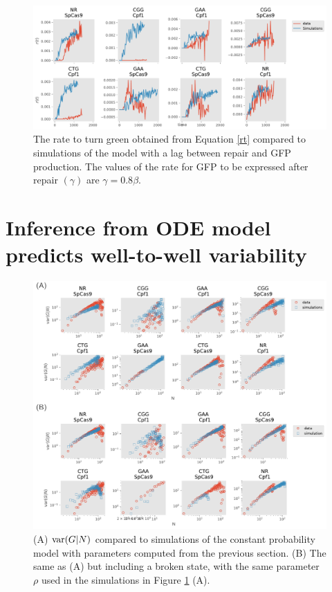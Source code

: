 \documentclass{article}
\begin{document}
\begin{figure}[h!]
\centering
\includegraphics[scale=0.6]{./../figures/r-vs-t_data_vs_gfp_lag_time.pdf}
\caption{ The rate to turn green obtained from Equation \ref{rt} compared to simulations of the model with a lag between repair and GFP production. The values of the rate for GFP to be expressed after repair $(\gamma)$ are $\gamma  = 0.8 \beta$.  }\label{fig:2}
\end{figure}



\section{Inference from ODE model predicts well-to-well variability}

\begin{figure}[t!]
\centering
\includegraphics[scale=0.7]{fig3.pdf}
\caption{(A) ${\rm var}(G|N)$ compared to simulations of the constant probability model with parameters computed from the previous section.   (B) The same as (A) but including a broken state, with the same parameter $\rho$ used in the simulations in Figure \ref{fig:2} (A). }\label{fig:3}
\end{figure}
\end{document}
